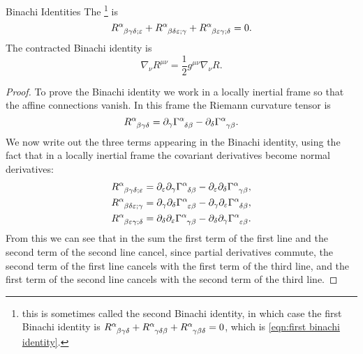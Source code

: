 \documentclass[fleqn]{NotesClass}
\newcommand*{\christoffel}[3]{\tensor{\Gamma}{^{#1}_{{#2}{#3}}}}
\newcommand*{\covariantDerivative}[1]{\nabla_{\!#1}}
\begin{document}
    \begin{lma}{Binachi Identities}{}
        The \footnote{this is sometimes called the second Binachi identity, in which case the first Binachi identity is \(\tensor{R}{^\alpha_{\beta\gamma\delta}} + \tensor{R}{^\alpha_{\gamma\delta\beta}} + \tensor{R}{^\alpha_{\gamma\beta\delta}} = 0\), which is \cref{eqn:first binachi identity}.} is
        \begin{equation}
            \tensor{R}{^\alpha_{\beta\gamma\delta;\varepsilon}} + \tensor{R}{^\alpha_{\beta\delta\varepsilon;\gamma}} + \tensor{R}{^\alpha_{\beta\varepsilon\gamma;\delta}} = 0.
        \end{equation}
        The contracted Binachi identity is
        \begin{equation}
            \covariantDerivative{\nu}R^{\mu\nu} = \frac{1}{2}g^{\mu\nu}\covariantDerivative{\nu}R.
        \end{equation}
        \begin{proof}
            To prove the Binachi identity we work in a locally inertial frame so that the affine connections vanish.
            In this frame the Riemann curvature tensor is
            \begin{equation}
                \tensor{R}{^\alpha_{\beta\gamma\delta}} = \partial_\gamma \christoffel{\alpha}{\delta}{\beta} - \partial_\delta \christoffel{\alpha}{\gamma}{\beta}.
            \end{equation}
            We now write out the three terms appearing in the Binachi identity, using the fact that in a locally inertial frame the covariant derivatives become normal derivatives:
            \begin{align}
                \tensor{R}{^{\alpha}_{\beta\gamma\delta;\varepsilon}} = \partial_\varepsilon \partial_\gamma \christoffel{\alpha}{\delta}{\beta} - \partial_\varepsilon\partial_\delta \christoffel{\alpha}{\gamma}{\beta},\\
                \tensor{R}{^{\alpha}_{\beta\delta\varepsilon;\gamma}} = \partial_\gamma \partial_\delta \christoffel{\alpha}{\varepsilon}{\beta} - \partial_\gamma \partial_\varepsilon \christoffel{\alpha}{\delta}{\beta},\\
                \tensor{R}{^{\alpha}_{\beta\varepsilon\gamma;\delta}} = \partial_\delta \partial_\varepsilon \christoffel{\alpha}{\gamma}{\beta} - \partial_\delta \partial_\gamma \christoffel{\alpha}{\varepsilon}{\beta}.
            \end{align}
            From this we can see that in the sum the first term of the first line and the second term of the second line cancel, since partial derivatives commute, the second term of the first line cancels with the first term of the third line, and the first term of the second line cancels with the second term of the third line.
            

\end{proof}
\end{lma}
\end{document}
